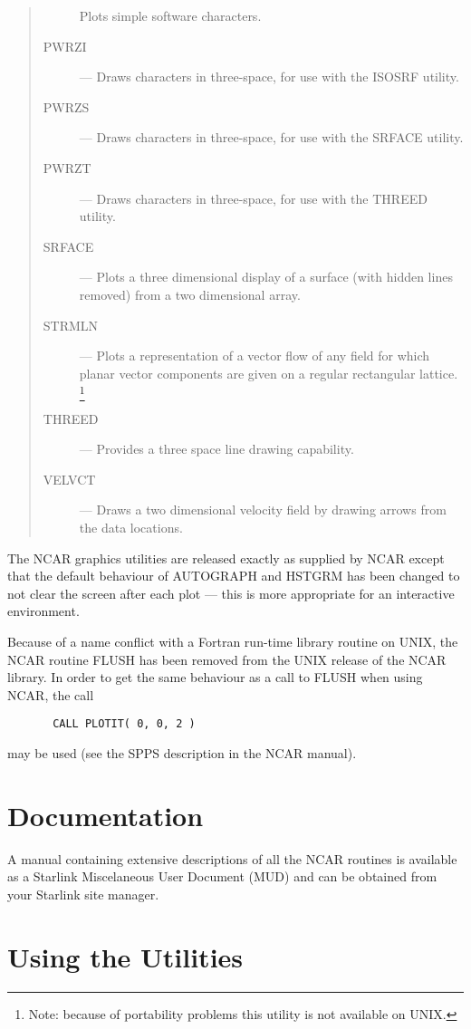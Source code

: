\begin{quote}
\begin{description}
 Plots simple software characters.
\item [PWRZI] --- 
 Draws characters in three-space, for use with the ISOSRF utility.
\item [PWRZS] --- 
 Draws characters in three-space, for use with the SRFACE utility.
\item [PWRZT] --- 
 Draws characters in three-space, for use with the THREED utility.
\item [SRFACE] --- 
 Plots a three dimensional display of a surface (with hidden lines removed)
 from a two dimensional array.
\item [STRMLN] --- 
 Plots a representation of a vector flow of any field for which planar vector
 components are given on a regular rectangular lattice.
 \footnote{Note: because of portability problems this utility is not available
 on UNIX.}
\item [THREED] --- 
 Provides a three space line drawing capability.
\item [VELVCT] --- 
 Draws a two dimensional velocity field by drawing arrows from the data
 locations.
\end{description}
\end{quote}

The NCAR graphics utilities are released exactly as supplied by NCAR except
that the default behaviour of AUTOGRAPH and HSTGRM has been changed to not
clear the screen after each plot --- this is more appropriate for an
interactive environment. 

Because of a name conflict with a Fortran run-time library  routine on UNIX,
the NCAR routine FLUSH has been removed from the UNIX  release of the NCAR
library.
In order to get the same behaviour as a call to FLUSH when using NCAR, 
the call 

\begin{verbatim}
       CALL PLOTIT( 0, 0, 2 )
\end{verbatim}

may be used (see the SPPS description in the NCAR manual).


\section{Documentation}

A manual containing extensive descriptions of all the NCAR routines
is available as a Starlink Miscelaneous User Document (MUD) and can be 
obtained from your Starlink site manager. 


\section{Using the Utilities}

